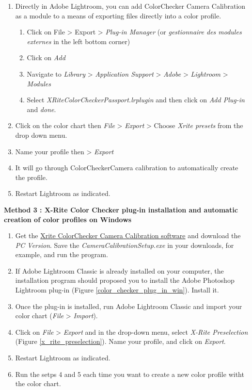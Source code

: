 \documentclass[10pt,letter,english]{article}
\begin{document}
\begin{enumerate}
    \item Directly in Adobe Lightroom, you can add ColorChecker Camera Calibration as a module to a means of exporting files directly into a color profile.
    \begin{enumerate}
        \item Click on File > Export > \textit{Plug-in Manager} (or \textit{gestionnaire des modules externes} in the left bottom corner)
        \item Click on \textit{Add}
        \item Navigate to \textit{Library} > \textit{Application Support} > \textit{Adobe} > \textit{Lightroom} > \textit{Modules}
        \item Select \textit{XRiteColorCheckerPassport.lrplugin} and then click on \textit{Add Plug-in} and \textit{done}.
    \end{enumerate}

    \item Click on the color chart then \textit{File} > \textit{Export} > Choose \textit{Xrite presets} from the drop down menu.
    \item Name your profile then > \textit{Export}
    \item It will go through ColorCheckerCamera calibration to automatically create the profile.
    \item Restart Lightroom as indicated.
\end{enumerate}

\bigskip
\noindent \textbf{Method 3 : X-Rite Color Checker plug-in installation and automatic creation of color profiles on Windows}


\begin{enumerate}
    \item Get the \href{https://xritephoto.com/ph_product_overview.aspx?ID=938&Action=Support&SoftwareID=2030}{Xrite ColorChecker Camera Calibration software} and download the \textit{PC Version}. Save the \textit{CameraCalibrationSetup.exe} in your downloads, for example, and run the program.
    \item If Adobe Lightroom Classic is already installed on your computer, the installation program should proposed you to install the Adobe Photoshop Lightroom plug-in (Figure \ref{color_checker_plug_in_win}). Install it.
    \item Once the plug-in is installed, run Adobe Lightroom Classic and import your color chart (\textit{File} > \textit{Import}).
    \item Click on \textit{File} > \textit{Export} and in the drop-down menu, select \textit{X-Rite Preselection} (Figure \ref{x_rite_preselection}). Name your profile, and click on \textit{Export}.
    \item Restart Lightroom as indicated.
    \item Run the setps 4 and 5 each time you want to create a new color profile witht the color chart.
    
    
\end{enumerate}
\end{document}
